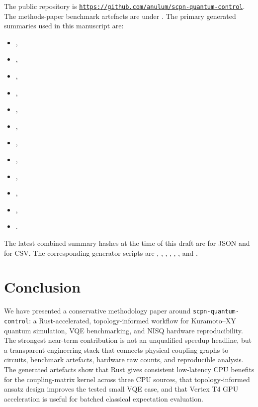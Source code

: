 \documentclass[preprint,aps,physrev,superscriptaddress,floatfix,longbibliography]{revtex4-2}
\begin{document}
The public repository is
\href{https://github.com/anulum/scpn-quantum-control}{\texttt{https://github.com/anulum/scpn-quantum-control}}.
The methods-paper benchmark artefacts are under
. The primary generated summaries used
in this manuscript are:
%
\begin{itemize}
  \item {},
  \item {},
  \item {},
  \item {},
  \item {},
  \item {},
  \item {},
  \item {},
  \item {},
  \item {},
  \item {},
  \item {}.
\end{itemize}
%
The latest combined summary hashes at the time of this draft are
\texttt{}
for JSON and
\texttt{}
for CSV. The corresponding generator scripts are
,
,
,
,
,
, and
.

\section{Conclusion}

We have presented a conservative methodology paper around
\texttt{scpn-quantum-control}: a Rust-accelerated, topology-informed
workflow for Kuramoto--XY quantum simulation, VQE benchmarking, and NISQ
hardware reproducibility. The strongest near-term contribution is not an
unqualified speedup headline, but a transparent engineering stack that
connects physical coupling graphs to circuits, benchmark artefacts,
hardware raw counts, and reproducible analysis. The generated artefacts
show that Rust gives consistent low-latency CPU benefits for the
coupling-matrix kernel across three CPU sources, that topology-informed
ansatz design improves the tested small VQE case, and that Vertex T4 GPU
acceleration is useful for batched classical expectation evaluation.
\end{document}

